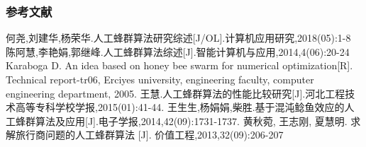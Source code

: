 \begin{frame}
	\frametitle{参考文献}
	\begin{thebibliography}{123456} 
	 何尧,刘建华,杨荣华.人工蜂群算法研究综述[J/OL].计算机应用研究,2018(05):1-8
	 陈阿慧,李艳娟,郭继峰.人工蜂群算法综述[J].智能计算机与应用,2014,4(06):20-24
	 Karaboga D. An idea based on honey bee swarm for numerical optimization[R]. Technical report-tr06, Erciyes university, engineering faculty, computer engineering department, 2005.
	 王慧.人工蜂群算法的性能比较研究[J].河北工程技术高等专科学校学报,2015(01):41-44.
	 王生生,杨娟娟,柴胜.基于混沌鲶鱼效应的人工蜂群算法及应用[J].电子学报,2014,42(09):1731-1737.
	 黄秋菀, 王志刚, 夏慧明. 求解旅行商问题的人工蜂群算法 [J]. 价值工程,2013,32(09):206-207
	
	\end{thebibliography}
\end{frame}
